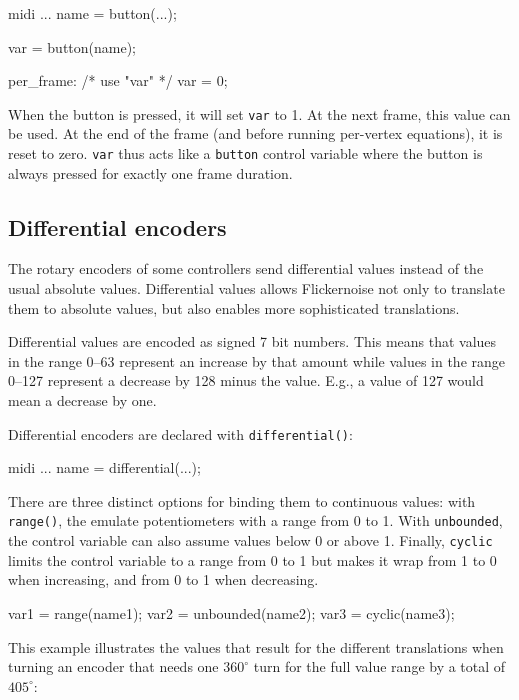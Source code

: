 \documentclass[11pt,a4paper]{article}
\begin{document}
\begin{listing}{1}
midi ... {
	name = button(...);
}

var = button(name);

per_frame:
	/* use "var" */
	var = 0;
\end{listing}

When the button is pressed, it will set {\tt var} to 1. At the next
frame, this value can be used. At the end of the frame (and before
running per-vertex equations), it is reset to zero. {\tt var} thus
acts like a {\tt button} control variable where the button is always
pressed for exactly one frame duration.




\subsection{Differential encoders}
\label{diff}

The rotary encoders of some controllers send differential values
instead of the usual absolute values. Differential values allows
Flickernoise not only to translate them to absolute values, but
also enables more sophisticated translations.

Differential values are encoded as signed 7 bit numbers. This means
that values in the range 0--63 represent an increase by that amount
while values in the range 0--127 represent a decrease by 128 minus
the value. E.g., a value of 127 would mean a decrease by one.

Differential encoders are declared with {\tt differential()}:

\begin{listing}{1}
midi ... {
	name = differential(...);
}
\end{listing}

There are three distinct options for binding them to continuous values:
with {\tt range()}, the
emulate potentiometers with a range from 0 to 1. With {\tt unbounded},
the control variable can also assume values below 0 or above 1. Finally,
{\tt cyclic} limits the control variable to a range from 0 to 1 but
makes it wrap from 1 to 0 when increasing, and from 0 to 1 when
decreasing.

\begin{listing}{1}
var1 = range(name1);
var2 = unbounded(name2);
var3 = cyclic(name3);
\end{listing}

This example illustrates the values that result for the different
translations when turning an encoder that needs one $360^\circ$ turn
for the full value range by a total of $405^\circ$:
\end{document}
